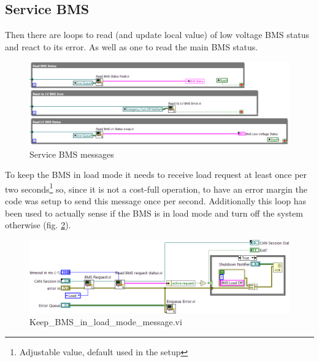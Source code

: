 \subsection{Service BMS}
Then there are loops to read (and update local value) of low voltage BMS status and react to its error. As well as one to read the main BMS status.
\begin{figure}[H]
    \centering
    \includegraphics[scale=\visc,max width=\textwidth]{figures/Read_BMSs.png}
    \caption{Service BMS messages}
    \label{BMSs_status}
\end{figure}
To keep the BMS in load mode it needs to receive load request at least once per two seconds\footnote{Adjustable value, default used in the setup} so, since it is not a cost-full operation, to have an error margin the code was setup to send this message once per second.
Additionally this loop has been used to actually sense if the BMS is in load mode and turn off the system otherwise (fig. \ref{vi:Keep_BMS_in_load_mode_message}).
\begin{figure}[H]
    \centering
    \includegraphics[scale=\visc,max width=\textwidth]{figures/Keep_BMS_in_load_mode_messaged}
    \caption{Keep\_BMS\_in\_load\_mode\_message.vi}
    \label{vi:Keep_BMS_in_load_mode_message}
\end{figure}

